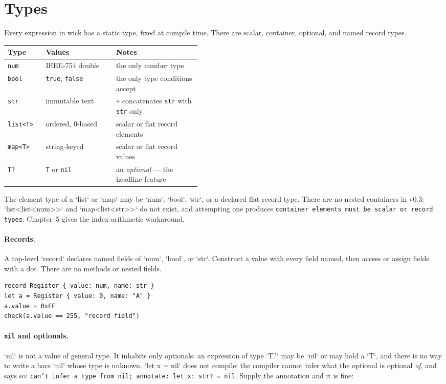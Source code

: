 \section{Types}

Every expression in wick has a static type, fixed at compile time. There are
scalar, container, optional, and named record types.

\begin{center}
\begin{tabular}{@{}llp{0.44\linewidth}@{}}
\toprule
\textbf{Type} & \textbf{Values} & \textbf{Notes} \\
\midrule
\texttt{num} & IEEE-754 double & the only number type \\
\texttt{bool} & \texttt{true}, \texttt{false} & the only type conditions accept \\
\texttt{str} & immutable text & \texttt{+} concatenates \texttt{str} with \texttt{str} only \\
\texttt{list<T>} & ordered, 0-based & scalar or flat record elements \\
\texttt{map<T>} & string-keyed & scalar or flat record values \\
\texttt{T?} & \texttt{T} or \texttt{nil} & an \emph{optional} --- the headline feature \\
\bottomrule
\end{tabular}
\end{center}

The element type of a `list` or `map` may be `num`, `bool`, `str`,
or a declared flat record type. There are no nested containers in v0.3: `list<list<num>>`
and `map<list<str>>` do not exist, and attempting one produces
\texttt{container elements must be scalar or record types}. Chapter~5 gives the
index-arithmetic workaround.

\paragraph{Records.} A top-level `record` declares named fields of `num`,
`bool`, or `str`. Construct a value with every field named, then access or
assign fields with a dot. There are no methods or nested fields.

\begin{lstlisting}[language=wick]
record Register { value: num, name: str }
let a = Register { value: 0, name: "A" }
a.value = 0xFF
check(a.value == 255, "record field")
\end{lstlisting}

\paragraph{\texttt{nil} and optionals.} `nil` is not a value of general type.
It inhabits only optionals: an expression of type `T?` may be `nil` or may
hold a `T`, and there is no way to write a bare `nil` whose type is unknown.
`let x = nil` does not compile; the compiler cannot infer what the optional is
optional \emph{of}, and says so:
\texttt{can't infer a type from nil; annotate: let x: str? = nil}. Supply the
annotation and it is fine:

